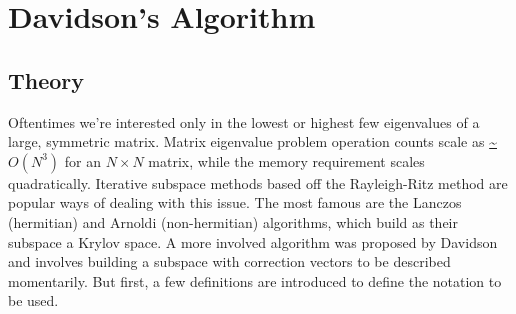 \documentclass{revtex4}
\begin{document}
\section{Davidson's Algorithm}
\subsection{Theory}
Oftentimes we're interested only in the lowest or highest few eigenvalues of a large, symmetric matrix. Matrix eigenvalue problem operation counts scale as \url{~}$O(N^3)$ for an $N \times N$ matrix, while the memory requirement scales quadratically. Iterative subspace methods based off the Rayleigh-Ritz method are popular ways of dealing with this issue. The most famous are the Lanczos (hermitian) and Arnoldi (non-hermitian) algorithms, which build as their subspace a Krylov space. A more involved algorithm was proposed by Davidson\cite{Davidson1975} and involves building a subspace with correction vectors to be described momentarily. But first, a few definitions are introduced to define the notation to be used.
\end{document}
